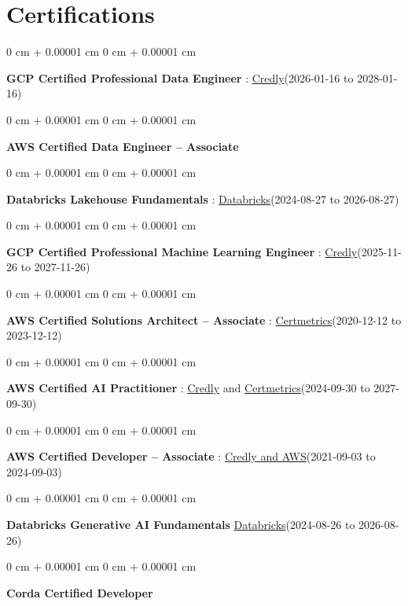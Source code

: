\documentclass[10pt, letterpaper]{article}
\newenvironment{onecolentry}{
    \begin{adjustwidth}{
        0 cm + 0.00001 cm
    }{
        0 cm + 0.00001 cm
    }
}{
    \end{adjustwidth}
} %
\begin{document}
    \vspace{2 pt }
    \section{Certifications}
        \vspace{2 pt }
        \begin{samepage}
            \begin{onecolentry}
                \textbf{GCP Certified Professional Data Engineer} : \href{https://www.credly.com/badges/977e96d9-12e7-4f6c-b8a7-df71fb7153b8/public_url}{Credly}(2026-01-16 to 2028-01-16)
            \end{onecolentry}
            \begin{onecolentry}
                \textbf{AWS Certified Data Engineer – Associate}
            \end{onecolentry}
            \begin{onecolentry}
                \textbf{Databricks Lakehouse Fundamentals} : \href{https://scl.io/FXGKS0u}{Databricks}(2024-08-27 to 2026-08-27)
            \end{onecolentry}
            \begin{onecolentry}
                \textbf{GCP Certified Professional Machine Learning Engineer} : \href{https://www.credly.com/badges/a6965347-09ea-4d8f-b398-0e151407160d/public_url}{Credly}(2025-11-26 to 2027-11-26)
            \end{onecolentry}
            \begin{onecolentry}
                \textbf{AWS Certified Solutions Architect – Associate} : \href{https://cp.certmetrics.com/amazon/en/public/verify/credential/SNBY48EBJJVE1SWX}{Certmetrics}(2020-12-12 to 2023-12-12)
            \end{onecolentry}
            \begin{onecolentry}
                \textbf{AWS Certified AI Practitioner} : \href{https://www.credly.com/badges/451b7ba5-8be1-4a8e-bbec-ade26627a6b6/public_url}{Credly} and \href{https://cp.certmetrics.com/amazon/en/public/verify/credential/495f0d9853874bf9a33c17f8e89ce131}{Certmetrics}(2024-09-30 to 2027-09-30)
            \end{onecolentry}
            \begin{onecolentry}
                \textbf{AWS Certified Developer – Associate} : \href{https://www.credly.com/badges/b8106fbd-d3d1-4204-8cdf-e708798fd582/public_url}{Credly and AWS}(2021-09-03  to 2024-09-03)
            \end{onecolentry}
            \begin{onecolentry}
                \textbf{Databricks Generative AI Fundamentals} \href{https://sgq.io/3uIFGNi}{Databricks}(2024-08-26 to 2026-08-26)
            \end{onecolentry}
            \begin{onecolentry}
                \textbf{Corda Certified Developer}
            \end{onecolentry}
        \end{samepage}
\end{document}
